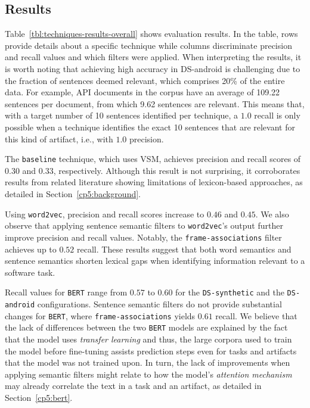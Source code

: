 \subsection{Results}


Table~\ref{tbl:techniques-results-overall} shows evaluation results. 
In the table, rows provide details about a specific technique while columns discriminate 
precision and recall values and which filters were applied. 
When interpreting the results, it is worth noting that achieving high accuracy in \acs{DS-android} is challenging
due to the fraction of sentences deemed relevant, which comprises 20\% of the entire data.
For example, API documents in the corpus have an average of 109.22 sentences per document, from which 9.62 sentences are relevant. 
This means that, with a target number of 10 sentences identified per technique, a $1.0$ recall is only possible when a technique identifies the exact 10 sentences that are relevant for this kind of artifact, i.e.,  with $1.0$ precision.







The \texttt{baseline} technique, which uses VSM, achieves precision and recall scores of $0.30$ and $0.33$, respectively. 
Although this result is not surprising, it corroborates results from related literature showing limitations of lexicon-based approaches, as detailed in Section~\ref{cp5:background}.





Using \texttt{word2vec}, precision and recall scores increase to $0.46$ and $0.45$. We also observe that applying sentence semantic filters to \texttt{word2vec}'s output further improve precision and recall values. Notably, the 
\texttt{frame-associations} filter achieves up to $0.52$ recall. These results suggest that both word semantics and sentence
semantics shorten lexical gaps when identifying information relevant to a software task.


Recall values for 
\texttt{BERT} range from $0.57$ to $0.60$ for 
the \texttt{DS-synthetic} and the \texttt{DS-android} configurations.
Sentence semantic filters do not provide substantial changes for \texttt{BERT}, where \texttt{frame-associations} yields $0.61$ recall. 
We believe that the 
lack of differences between the two \texttt{BERT} models are explained by 
the fact that the model uses \textit{transfer learning} and thus, the  
large corpora used to train the model before fine-tuning assists prediction steps even for tasks and artifacts that the model was not trained upon. In turn, the lack of improvements when applying  semantic filters might relate to how the model's \textit{attention mechanism} may already correlate the text in a task and an artifact, as detailed in Section~\ref{cp5:bert}.



